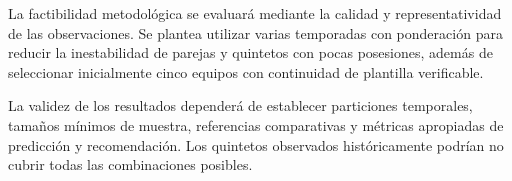 La factibilidad metodológica se evaluará mediante la calidad y representatividad de las observaciones. Se plantea utilizar varias temporadas con ponderación para reducir la inestabilidad de parejas y quintetos con pocas posesiones, además de seleccionar inicialmente cinco equipos con continuidad de plantilla verificable.

La validez de los resultados dependerá de establecer particiones temporales, tamaños mínimos de muestra, referencias comparativas y métricas apropiadas de predicción y recomendación. Los quintetos observados históricamente podrían no cubrir todas las combinaciones posibles.